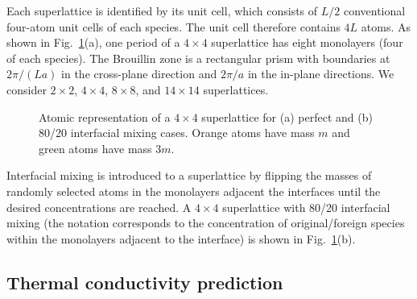 \documentclass[aps,prb,preprint,preprintnumbers,amsmath,amssymb,floatfix,superscriptaddress]{revtex4}
\begin{document}
Each superlattice is identified by its unit cell, which consists of $L/2$ conventional four-atom unit cells of each species. The unit cell therefore contains $4L$ atoms. As shown in Fig.~\ref{fig:md_domain}(a), one period of a $4\times4$ superlattice has eight monolayers (four of each species). The Brouillin zone is a rectangular prism with boundaries at $2\pi/(La)$ in the cross-plane direction and $2\pi/a$ in the in-plane directions. We consider $2\times2$, $4\times4$, $8\times8$, and $14\times14$ superlattices.
\begin{figure}[t!]
\begin{center}
\renewcommand{\figure}{Fig.}
\caption{Atomic representation of a $4\times4$ superlattice for (a) perfect and (b) 80/20 interfacial mixing cases. Orange atoms have mass  $m$ and green atoms have mass $3m$.}
\label{fig:md_domain}
\end{center}
\end{figure}

Interfacial mixing is introduced to a superlattice by flipping the masses of randomly selected atoms in the monolayers adjacent the interfaces until the desired concentrations are reached.\cite{PhysRevB.79.075316} A $4\times4$ superlattice with 80/20 interfacial mixing (the notation corresponds to the concentration of original/foreign species within the monolayers adjacent to the interface) is shown in Fig.~\ref{fig:md_domain}(b).

\subsection{Thermal conductivity prediction}\label{SEC:methods}
\end{document}

